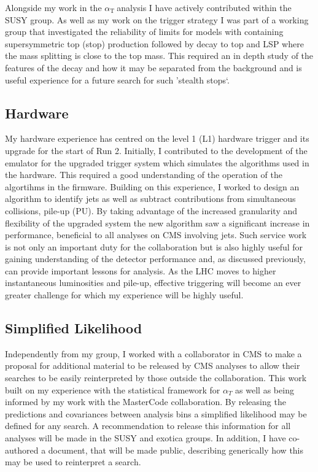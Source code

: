 \documentclass[11pt]{article}
\theoremstyle{plain} \numberwithin{equation}{section}
\theoremstyle{definition}
\DeclareRobustCommand{\alphat}{$\alpha_{\text{T}}~$}
\begin{document}
Alongside my work in the \alphat analysis I have actively contributed within the SUSY group.
As well as my work on the trigger strategy I was part of a working group that investigated
the reliability of limits for models with containing supersymmetric top (stop) production followed by decay 
to top and LSP where the mass splitting is close to the top mass. This required an in depth study of the features of the decay and how it 
may be separated from the background and is useful experience for a future search for such 'stealth stops`.

\subsection*{Hardware}
My hardware experience has centred on the level 1 (L1) hardware trigger and its
upgrade for the start of Run 2. Initially, I contributed to the development of the emulator for the upgraded
trigger system which simulates the algorithms used in the hardware. This required a good understanding
of the operation of the algortihms in the firmware. Building on this experience, 
I worked to design an algorithm to identify jets as well as subtract contributions from simultaneous collisions, 
pile-up (PU). By taking advantage of the increased granularity and flexibility of the 
upgraded system the new algorithm saw a significant increase in performance, beneficial
to all analyses on CMS involving jets. Such service work is not only an important duty for the collaboration but is also
highly useful for gaining understanding of the detector performance and, as discussed previously,
can provide important lessons for analysis. As the LHC moves to higher instantaneous 
luminosities and pile-up, effective triggering will become an ever greater challenge 
for which my experience will be highly useful. 

\subsection*{Simplified Likelihood}
Independently from my group, I worked with a collaborator in CMS to make a proposal 
for additional material to be released by CMS analyses
to allow their searches to be easily reinterpreted by those outside the collaboration. 
This work built on my experience with the statistical framework for $\alpha_T$ as well as being 
informed by my work with the MasterCode collaboration. By releasing the predictions and covariances between analysis bins 
a simplified likelihood may be defined for any search. A recommendation to release this information for all analyses
will be made in the SUSY and exotica groups. In addition, I have co-authored a document,
that will be made public, describing generically how this may be used to reinterpret a search.
\end{document}
